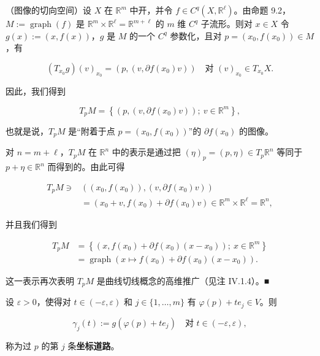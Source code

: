 \begin{example}

（图像的切向空间）设 $ X $ 在 $ \mathbb{R}^{m} $ 中开，并令 $ f \in C^{q}(X,\mathbb{R}^{\ell}) $。由命题 9.2，$ M := \operatorname{graph}(f) $ 是 $ \mathbb{R}^{m}\times\mathbb{R}^{\ell} = \mathbb{R}^{m+\ell} $ 的 $ m $ 维 $ C^{q} $ 子流形。则对 $ x \in X $ 令 $ g(x) := (x, f(x)) $，$ g $ 是 $ M $ 的一个 $ C^{q} $ 参数化，且对 $ p = (x_{0}, f(x_{0})) \in M $，有

\[
(T_{x_{0}}g)(v)_{x_{0}} = \left(p, (v, \partial f(x_{0})v)\right) \quad \text{对 } (v)_{x_{0}} \in T_{x_{0}}X .
\]

因此，我们得到

\[
T_{p}M = \left\{ \left(p, (v, \partial f(x_{0})v)\right) ;\ v \in \mathbb{R}^{m} \right\} ,
\]

也就是说，$ T_{p}M $ 是“附着于点 $ p = (x_{0}, f(x_{0})) $”的 $ \partial f(x_{0}) $ 的图像。


对 $ n = m + \ell $，$ T_{p}M $ 在 $ \mathbb{R}^{n} $ 中的表示是通过把 $ (\eta)_{p} = (p,\eta) \in T_{p}\mathbb{R}^{n} $ 等同于 $ p + \eta \in \mathbb{R}^{n} $ 而得到的。由此可得

\begin{equation*}
\begin{aligned}
T_{p}M \ni &\left((x_{0}, f(x_{0})), (v, \partial f(x_{0})v)\right) \\ &= \left(x_{0} + v, f(x_{0}) + \partial f(x_{0})v\right) \in \mathbb{R}^{m}\times\mathbb{R}^{\ell} = \mathbb{R}^{n} ,
\end{aligned}
\end{equation*}

并且我们得到

\begin{equation*}
\begin{aligned}
T_{p}M &= \left\{ \left(x, f(x_{0}) + \partial f(x_{0})(x - x_{0})\right) ;\ x \in \mathbb{R}^{m} \right\} \\ &= \operatorname{graph}\left(x \mapsto f(x_{0}) + \partial f(x_{0})(x - x_{0})\right) .
\end{aligned}
\end{equation*}

这一表示再次表明 $ T_{p}M $ 是曲线切线概念的高维推广（见注 IV.1.4）。\nobreak\hspace{0.35em}■

设 $ \varepsilon > 0 $，使得对 $ t \in (-\varepsilon,\varepsilon) $ 和 $ j \in \{1,\ldots,m\} $ 有 $ \varphi(p) + te_{j} \in V $。则

\[
\gamma_{j}(t) := g\left(\varphi(p) + te_{j}\right) \quad \text{对 } t \in (-\varepsilon,\varepsilon) ,
\]

称为过 $ p $ 的第 $ j $ 条\textbf{坐标道路}。

\end{example}

